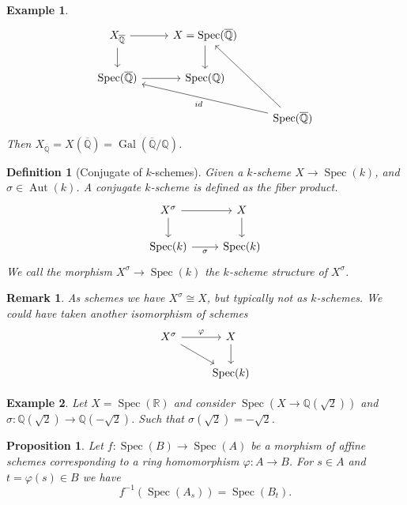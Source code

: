\documentclass{article}
\newtheorem{proposition}{Proposition}[section]
\newtheorem{definition}{Definition}[section]
\newtheorem{remark}{Remark}[section]
\newtheorem{example}{Example}[section]
\numberwithin{equation}{section}
\DeclareMathOperator{\Gal}{Gal}
\DeclareMathOperator{\Spec}{Spec}
\DeclareMathOperator{\Aut}{Aut}
\begin{document}
\begin{example}
\[
\begin{tikzcd}
X_{\overline{\mathbb{Q}}} \arrow[r] \arrow[d] & X=\Spec(\overline{\mathbb{Q}}) \arrow[d] &                                                            \\
\Spec(\overline{\mathbb{Q}}) \arrow[r]        & \Spec(\mathbb{Q})                        &                                                            \\
                                              &                                          & \Spec(\overline{\mathbb{Q}}) \arrow[luu] \arrow[llu, "id"]
\end{tikzcd}
\]
Then $X_{\overline{\mathbb{Q}}}=X(\overline{\mathbb{Q}})=\Gal(\overline{\mathbb{Q}}/\mathbb{Q})$.
\end{example}

\begin{definition}[Conjugate of $k$-schemes]
Given a $k$-scheme $X\to\Spec(k)$, and $\sigma\in\Aut(k)$. A conjugate $k$-scheme is defined as the fiber product.
\[
\begin{tikzcd}
X^\sigma \arrow[r] \arrow[d]  & X \arrow[d] \\
\Spec(k) \arrow[r, "\sigma"'] & \Spec(k)   
\end{tikzcd}
\]
We call the morphism $X^\sigma\to\Spec(k)$ the $k$-scheme structure of $X^\sigma$.
\end{definition}

\begin{remark}
As schemes we have $X^\sigma\cong X$, but typically not as $k$-schemes. We could have taken another isomorphism of schemes
\[
\begin{tikzcd}
X^\sigma \arrow[rd] \arrow[r, "\varphi"] & X \arrow[d] \\
                                         & \Spec(k)   
\end{tikzcd}
\]
\end{remark}

\begin{example}
Let $X=\Spec(\mathbb{R})$ and consider $\Spec(X\to\mathbb{Q}(\sqrt{2}))$ and $\sigma:\mathbb{Q}(\sqrt{2})\to\mathbb{Q}(-\sqrt{2})$. Such that $\sigma(\sqrt{2})=-\sqrt{2}$. 
\end{example}

\begin{proposition}
Let $f:\Spec(B)\to\Spec(A)$ be a morphism of affine schemes corresponding to a ring homomorphism $\varphi:A\to B$. For $s\in A$ and $t=\varphi(s)\in B$ we have
\begin{equation*}
f^{-1}(\Spec(A_s)) = \Spec(B_t).
\end{equation*}
\end{proposition}
\end{document}
